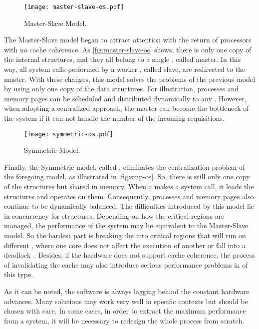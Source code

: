 			\begin{figure}[t]
				\centering%
				\caption{Master-Slave \os Model.}%
				\label{fig:master-slave-os}%
				\texttt{[image: master-slave-os.pdf]}%
			\end{figure}

			The Master-Slave model began to attract attention with the return of
			processors with no cache coherence.
			As \autoref{fig:master-slave-os} shows, there is only one copy of
			the internal \os structures, and they all belong to a single \cpu, called master.
			In this way, all system calls performed by a worker \cpu, called slave,
			are redirected to the master.
			With these changes, this model solves the problems of the previous model
			by using only one copy of the data structures.
			For illustration, processes and memory pages can be scheduled and
			distributed dynamically to any \cpus.
			However, when adopting a centralized approach, the master can become
			the bottleneck of the system if it can not handle the number of the
			incoming requisitions.

			\begin{figure}[t]
				\centering%
				\caption{Symmetric \os Model.}%
				\label{fig:smp-os}%
				\texttt{[image: symmetric-os.pdf]}%
			\end{figure}

			Finally, the Symmetric model, called \smp, eliminates the centralization
			problem of the foregoing model, as illustrated in \autoref{fig:smp-os}.
			So, there is still only one copy of the \os structures but shared in memory.
			When a \cpu makes a system call, it loads the structures and operates on them.
			Consequently, processes and memory pages also continue to be dynamically balanced.
			The difficulties introduced by this model lie in concurrency for \os structures.
			Depending on how the critical regions are managed, the performance of the system
			may be equivalent to the Master-Slave model. So the hardest part is breaking the
			\os into critical regions that will run on different \cpus, where one core does
			not affect the execution of another or fall into a deadlock~\cite{tanenbaum:4ed}.
			Besides, if the hardware does not support cache coherence, the process of
			invalidating the cache may also introduce serious performance problems in \oss of this type.

			As it can be noted, the software is always lagging behind the constant hardware advances.
			Many solutions may work very well in specific contexts but should be chosen with care.
			In some cases, in order to extract the maximum performance from a system, it will be
			necessary to redesign the whole process from scratch.

